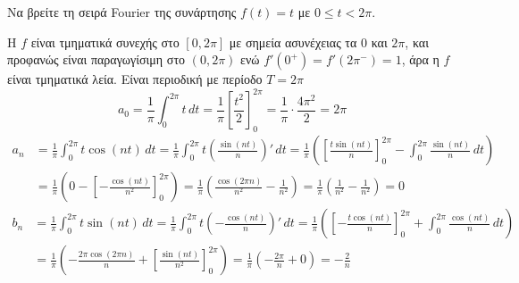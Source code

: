 



\pagestyle{vangelis}




\begin{example}
  Να βρείτε τη σειρά Fourier της συνάρτησης $ f(t)=t $ με $ 0 \leq t < 2 \pi $.
\end{example}
\begin{solution}
  Η $f$ είναι τμηματικά συνεχής στο $ [0,2 \pi] $ με σημεία ασυνέχειας τα $ 0 $ και 
  $ 2 \pi $, και προφανώς είναι παραγωγίσιμη στο $ (0,2 \pi) $ ενώ $ f'(0^{+}) = f'(2
  \pi ^{-}) = 1  $, άρα η $f$ είναι τμηματικά λεία. Είναι περιοδική με περίοδο 
  $ T=2 \pi $ 
  \[
    a_{0} = \frac{1}{\pi} \int _{0}^{2 \pi} t\,{dt} = \frac{1}{\pi}
    \left[\frac{t^{2}}{2}\right]_{0}^{2 \pi} = \frac{1}{\pi} \cdot \frac{4 \pi ^{2}}{2} 
    = 2 \pi
  \] 
  \begin{align*}
    a_{n} &= \frac{1}{\pi} \int _{0}^{2 \pi} t \cos{(nt)} \,{dt} = \frac{1}{\pi} 
    \int _{0}^{2 \pi} t \left(\frac{\sin{(nt)}}{n}\right)' \,{dt} = \frac{1}{\pi}
    \left(\left[\frac{t \sin{(nt)}}{n} \right]_{0}^{2 \pi} - \int _{0}^{2 \pi}
    \frac{\sin{(nt)}}{n} \,{dt}\right) \\ 
          &= \frac{1}{\pi} \left(0 - \left[- \frac{\cos{(nt)}}{n^{2}}\right]_{0}^{2 
            \pi}\right) = \frac{1}{\pi} \left(\frac{\cos{(2 \pi n)}}{n^{2}} - 
            \frac{1}{n^{2}}\right) = \frac{1}{\pi} \left(\frac{1}{n^{2}} - 
          \frac{1}{n^{2}}\right) = 0
  \end{align*} 
  \begin{align*}
    b_{n} &= \frac{1}{\pi} \int _{0}^{2 \pi} t \sin{(nt)} \,{dt} = \frac{1}{\pi} 
    \int _{0}^{2 \pi } t \left(- \frac{\cos{(nt)}}{n}\right)' \,{dt} = \frac{1}{\pi}
    \left(\left[- \frac{t \cos{(nt)}}{n} \right]_{0}^{2 \pi} + \int _{0}^{2 \pi}
    \frac{\cos{(nt)}}{n} \,{dt}\right) \\
          &= \frac{1}{\pi} \left(- \frac{2 \pi \cos{(2 \pi n)}}{n} + \left[
            \frac{\sin{(nt)}}{n^{2}}\right]_{0}^{2 \pi}\right) = \frac{1}{\pi} \left(-
          \frac{2 \pi}{n} + 0\right) = - \frac{2}{n} 
  \end{align*}
\end{solution}



